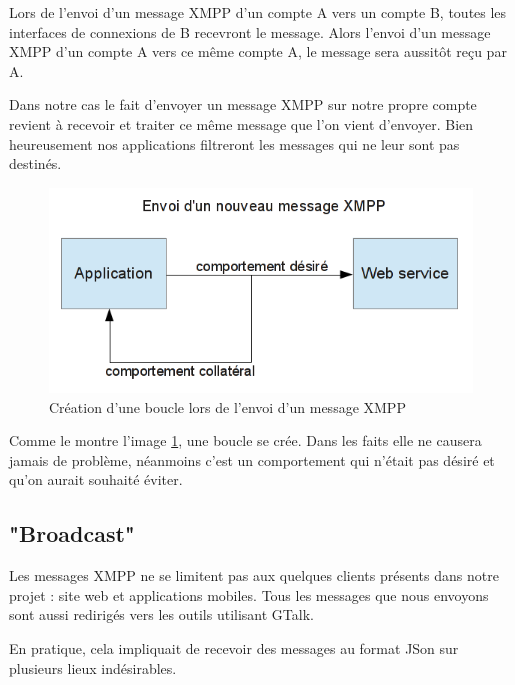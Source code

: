 Lors de l'envoi d'un message XMPP d'un compte A vers un compte B, toutes les interfaces de connexions de B recevront le message.
Alors l'envoi d'un message XMPP d'un compte A vers ce même compte A, le message sera aussitôt reçu par A.

Dans notre cas le fait d'envoyer un message XMPP sur notre propre compte revient à recevoir et traiter ce même message que l'on vient d'envoyer.
Bien heureusement nos applications filtreront les messages qui ne leur sont pas destinés.

\begin{figure}[!h]
	\center
	\includegraphics[width=12cm]{img/boucle-envoi-xmpp.png}
	\caption{Création d'une boucle lors de l'envoi d'un message XMPP}
	\label{boucle-envoi-xmpp}
\end{figure}

Comme le montre l'image \ref{boucle-envoi-xmpp}, une boucle se crée.
Dans les faits elle ne causera jamais de problème, néanmoins c'est un comportement qui n'était pas désiré et qu'on aurait souhaité éviter.
\\




\subsection{"Broadcast"}

Les messages XMPP ne se limitent pas aux quelques clients présents dans notre projet : site web et applications mobiles.
Tous les messages que nous envoyons sont aussi redirigés vers les outils utilisant GTalk.

En pratique, cela impliquait de recevoir des messages au format JSon sur plusieurs lieux indésirables.

